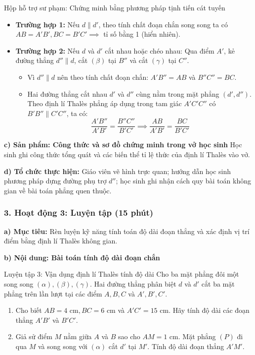 \documentclass[12pt, a4paper]{article}
\begin{document}
\begin{scaffoldbox}{Hộp hỗ trợ sư phạm: Chứng minh bằng phương pháp tịnh tiến cát tuyến}
\begin{itemize}[leftmargin=0.6cm]
    \item \textbf{Trường hợp 1:} Nếu $d \parallel d'$, theo tính chất đoạn chắn song song ta có $AB = A'B', BC = B'C' \implies$ tỉ số bằng 1 (hiển nhiên).
    \item \textbf{Trường hợp 2:} Nếu $d$ và $d'$ cắt nhau hoặc chéo nhau: Qua điểm $A'$, kẻ đường thẳng $d'' \parallel d$, cắt $(\beta)$ tại $B''$ và cắt $(\gamma)$ tại $C''$.
    \begin{itemize}
        \item Vì $d'' \parallel d$ nên theo tính chất đoạn chắn: $A'B'' = AB$ và $B''C'' = BC$.
        \item Hai đường thẳng cắt nhau $d'$ và $d''$ cùng nằm trong mặt phẳng $(d', d'')$. Theo định lí Thalès phẳng áp dụng trong tam giác $A'C'C''$ có $B'B'' \parallel C'C''$, ta có:
        $$\dfrac{A'B''}{A'B'} = \dfrac{B''C''}{B'C'} \implies \dfrac{AB}{A'B'} = \dfrac{BC}{B'C'}$$
    \end{itemize}
\end{itemize}
\end{scaffoldbox}

\noindent \textbf{c) Sản phẩm: Công thức và sơ đồ chứng minh trong vở học sinh}
Học sinh ghi công thức tổng quát và các biến thể tỉ lệ thức của định lí Thalès vào vở.

\noindent \textbf{d) Tổ chức thực hiện:}
Giáo viên vẽ hình trực quan; hướng dẫn học sinh phương pháp dựng đường phụ trợ $d''$; học sinh ghi nhận cách quy bài toán không gian về bài toán phẳng quen thuộc.

\subsubsection*{3. Hoạt động 3: Luyện tập (15 phút)}

\noindent \textbf{a) Mục tiêu:}
Rèn luyện kỹ năng tính toán độ dài đoạn thẳng và xác định vị trí điểm bằng định lí Thalès không gian.

\noindent \textbf{b) Nội dung: Bài toán tính độ dài đoạn chắn}
\begin{pedabox}{Luyện tập 3: Vận dụng định lí Thalès tính độ dài}
Cho ba mặt phẳng đôi một song song $(\alpha), (\beta), (\gamma)$. Hai đường thẳng phân biệt $d$ và $d'$ cắt ba mặt phẳng trên lần lượt tại các điểm $A, B, C$ và $A', B', C'$.
\begin{enumerate}[leftmargin=0.6cm]
    \item Cho biết $AB = 4\text{ cm}, BC = 6\text{ cm}$ và $A'C' = 15\text{ cm}$. Hãy tính độ dài các đoạn thẳng $A'B'$ và $B'C'$.
    \item Giả sử điểm $M$ nằm giữa $A$ và $B$ sao cho $AM = 1\text{ cm}$. Mặt phẳng $(P)$ đi qua $M$ và song song với $(\alpha)$ cắt $d'$ tại $M'$. Tính độ dài đoạn thẳng $A'M'$.
\end{enumerate}
\end{pedabox}
\end{document}
